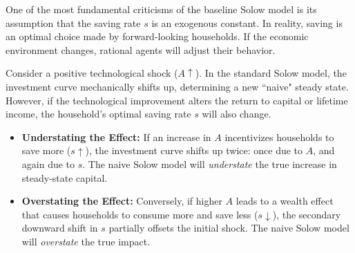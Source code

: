 
One of the most fundamental criticisms of the baseline Solow model is its assumption that the saving rate $s$ is an exogenous constant. In reality, saving is an optimal choice made by forward-looking households. If the economic environment changes, rational agents will adjust their behavior.

Consider a positive technological shock ($A \uparrow$). In the standard Solow model, the investment curve mechanically shifts up, determining a new ``naive" steady state. However, if the technological improvement alters the return to capital or lifetime income, the household's optimal saving rate $s$ will also change.
\begin{itemize}
    \item \textbf{Understating the Effect:} If an increase in $A$ incentivizes households to save more ($s \uparrow$), the investment curve shifts up twice: once due to $A$, and again due to $s$. The naive Solow model will \textit{understate} the true increase in steady-state capital.
    \item \textbf{Overstating the Effect:} Conversely, if higher $A$ leads to a wealth effect that causes households to consume more and save less ($s \downarrow$), the secondary downward shift in $s$ partially offsets the initial shock. The naive Solow model will \textit{overstate} the true impact.
\end{itemize}

